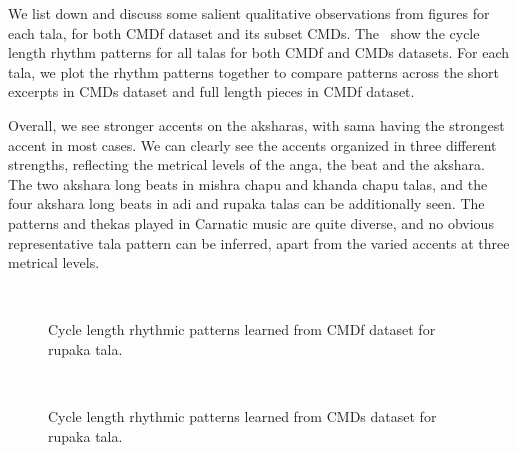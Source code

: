 We list down and discuss some salient qualitative observations from figures for each \gls{tala}, for both \acrshort{CMDf} dataset and its subset \acrshort{CMDs}. The \ show the cycle length rhythm patterns for all \glspl{tala} for both \acrshort{CMDf} and \acrshort{CMDs} datasets. For each \gls{tala}, we plot the rhythm patterns together to compare patterns across the short excerpts in \acrshort{CMDs} dataset and full length pieces in \acrshort{CMDf} dataset. 

Overall, we see stronger accents on the \glspl{akshara}, with \gls{sama} having the strongest accent in most cases. We can clearly see the accents organized in three different strengths, reflecting the metrical levels of the \gls{anga}, the beat and the \gls{akshara}. The two \gls{akshara} long beats in \gls{mishra chapu} and \gls{khanda chapu} \glspl{tala}, and the four \gls{akshara} long beats in \gls{adi} and \gls{rupaka} \glspl{tala} can be additionally seen. The patterns and \glspl{theka} played in Carnatic music are quite diverse, and no obvious representative \gls{tala} pattern can be inferred, apart from the varied accents at three metrical levels. 
\begin{figure}[t]
\captionsetup[subfigure]{labelformat=empty}
\centering
{} \\ \vspace{-1.35cm}
\caption[Rhythm patterns in \gls{rupaka} \gls{tala} learned from \acrshort{CMDf} dataset]{Cycle length rhythmic patterns learned from \acrshort{CMDf} dataset for \gls{rupaka} \gls{tala}.}\label{fig:tt:CMDf:rupaka}
\end{figure}
%
\begin{figure}[t]
\captionsetup[subfigure]{labelformat=empty}
\centering
{} \\ \vspace{-1.35cm}
\caption[Rhythm patterns in \gls{rupaka} \gls{tala} learned from \acrshort{CMDs} dataset]{Cycle length rhythmic patterns learned from \acrshort{CMDs} dataset for \gls{rupaka} \gls{tala}.}\label{fig:tt:CMD:rupaka}
\end{figure}
%

